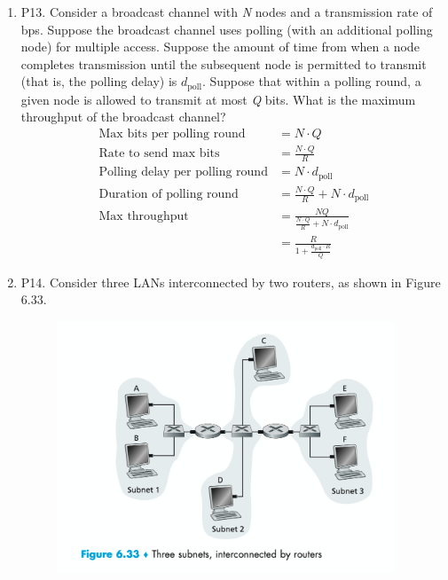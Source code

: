 \documentclass[12pt]{article}
\begin{document}
\begin{enumerate}
\begin{figure}[h!]
    \end{figure}
    \newpage
    \item P13. Consider a broadcast channel with \textit{N} nodes and a transmission rate of  bps. Suppose the broadcast channel uses polling (with an additional polling node) for multiple access. Suppose the amount of time from when a node completes transmission until the subsequent node is permitted to transmit (that is, the polling delay) is \(d_{\mathrm{poll}}\). Suppose that within a polling round, a given node is allowed to transmit at most \textit{Q} bits. What is the maximum throughput of the broadcast channel?
    \begin{align*}
        \text{Max bits per polling round}&=N\cdot Q\\
        \text{Rate to send max bits}&=\frac{N\cdot Q}{R}\\
        \text{Polling delay per polling round}&=N\cdot d_{\mathrm{poll}}\\
        \text{Duration of polling round}&=\frac{N\cdot Q}{R}+N\cdot d_{\mathrm{poll}}\\
        \text{Max throughput}&=\frac{NQ}{\frac{N\cdot Q}{R}+N\cdot d_{\mathrm{poll}}}\\
        &=\frac{R}{1+\frac{d_{\mathrm{poll}}\cdot R}{Q}}
    \end{align*}
    \item P14. Consider three LANs interconnected by two routers, as shown in Figure 6.33.
    \begin{figure}[h!]
        \centering
        \includegraphics[width=0.95\textwidth]{Fig6.33.png}
    \end{figure}
    \newpage

\end{enumerate}
\end{document}
